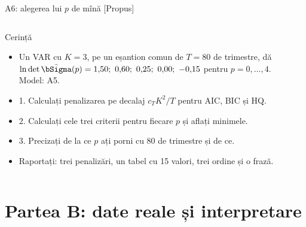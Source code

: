 \begin{frame}{A6: alegerea lui $p$ de mînă [Propus]}
\propsub
\itemsize{\scriptsize}
\begin{columns}[T]
\begin{column}{\taskw}
\begin{block}{Cerință}
\begin{itemize}
    \item Un VAR cu $K = 3$, pe un eșantion comun de $T = 80$ de trimestre, dă $\ln\det\tilde\bSigma(p) = 1{,}50;\ 0{,}60;\ 0{,}25;\ 0{,}00;\ -0{,}15$ pentru $p = 0, \dots, 4$. Model: A5.
    \item 1. Calculați penalizarea pe decalaj $c_T K^2/T$ pentru AIC, BIC și HQ.
    \item 2. Calculați cele trei criterii pentru fiecare $p$ și aflați minimele.
    \item 3. Precizați de la ce $p$ ați porni cu 80 de trimestre și de ce.
    \item Raportați: trei penalizări, un tabel cu 15 valori, trei ordine și o frază.
\end{itemize}
\end{block}
\end{column}
\begin{column}{\solw}
\end{column}
\end{columns}
\end{frame}


\section{Partea B: date reale și interpretare}

